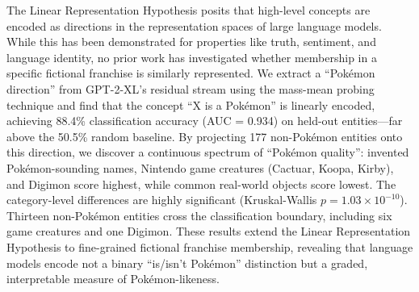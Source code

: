 The Linear Representation Hypothesis posits that high-level concepts are encoded as directions in the representation spaces of large language models. While this has been demonstrated for properties like truth, sentiment, and language identity, no prior work has investigated whether membership in a specific fictional franchise is similarly represented. We extract a ``Pok\'{e}mon direction'' from GPT-2-XL's residual stream using the mass-mean probing technique and find that the concept ``X is a Pok\'{e}mon'' is linearly encoded, achieving 88.4\% classification accuracy (AUC = 0.934) on held-out entities---far above the 50.5\% random baseline. By projecting 177 non-Pok\'{e}mon entities onto this direction, we discover a continuous spectrum of ``Pok\'{e}mon quality'': invented Pok\'{e}mon-sounding names, Nintendo game creatures (Cactuar, Koopa, Kirby), and Digimon score highest, while common real-world objects score lowest. The category-level differences are highly significant (Kruskal-Wallis $p = 1.03 \times 10^{-10}$). Thirteen non-Pok\'{e}mon entities cross the classification boundary, including six game creatures and one Digimon. These results extend the Linear Representation Hypothesis to fine-grained fictional franchise membership, revealing that language models encode not a binary ``is/isn't Pok\'{e}mon'' distinction but a graded, interpretable measure of Pok\'{e}mon-likeness.